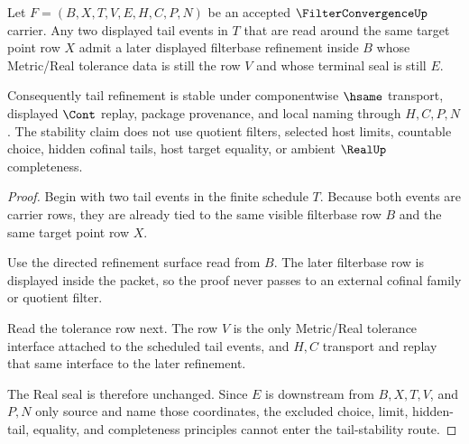 \begin{theorem}
\label{thm:filter-convergence-tail-stability}
Let $F=(B,X,T,V,E,H,C,P,N)$ be an accepted $\FilterConvergenceUp$ carrier. Any two displayed tail events in $T$ that are read around the same target point row $X$ admit a later displayed filterbase refinement inside $B$ whose Metric/Real tolerance data is still the row $V$ and whose terminal seal is still $E$.

Consequently tail refinement is stable under componentwise $\hsame$ transport, displayed $\Cont$ replay, package provenance, and local naming through $H,C,P,N$. The stability claim does not use quotient filters, selected host limits, countable choice, hidden cofinal tails, host target equality, or ambient $\RealUp$ completeness.
\end{theorem}
\begin{proof}
Begin with two tail events in the finite schedule $T$. Because both events are carrier rows, they are already tied to the same visible filterbase row $B$ and the same target point row $X$.

Use the directed refinement surface read from $B$. The later filterbase row is displayed inside the packet, so the proof never passes to an external cofinal family or quotient filter.

Read the tolerance row next. The row $V$ is the only Metric/Real tolerance interface attached to the scheduled tail events, and $H,C$ transport and replay that same interface to the later refinement.

The Real seal is therefore unchanged. Since $E$ is downstream from $B,X,T,V$, and $P,N$ only source and name those coordinates, the excluded choice, limit, hidden-tail, equality, and completeness principles cannot enter the tail-stability route.
\end{proof}

